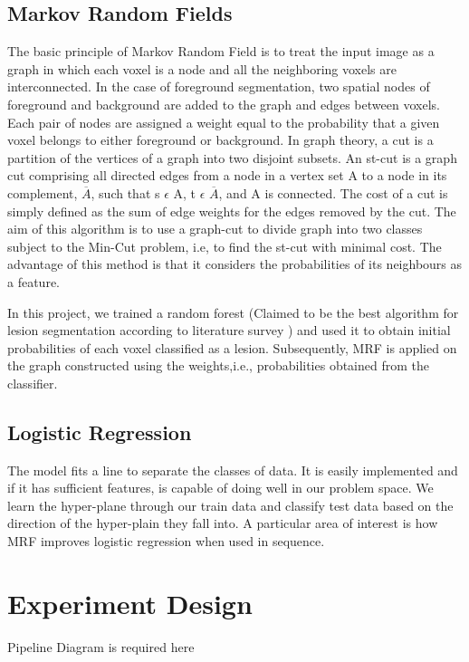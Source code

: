 \documentclass{article} %
\begin{document}
\subsection{Markov Random Fields}
The basic principle of Markov Random Field is to treat the input image as a graph in which each voxel is a node and all the neighboring voxels are interconnected. In the case of foreground segmentation, two spatial nodes of foreground and background are added to the graph and edges between voxels. Each pair of nodes are assigned a weight equal to the probability that a given voxel belongs to either foreground or background. In graph theory, a cut is a partition of the vertices of a graph into two disjoint subsets. An st-cut is a graph cut comprising all directed edges from a node in a vertex set A to a node in its complement, $\overline{A}$, such that s $\epsilon$ A, t $\epsilon$ $\overline{A}$, and A is connected. The cost of a cut is simply defined as the sum of edge weights for the edges removed by the cut. The aim of this algorithm is to use a graph-cut to divide graph into two classes subject to the Min-Cut problem, i.e, to find the st-cut with minimal cost. The advantage of this method is that it considers the probabilities of its neighbours as a feature.

In this project, we trained a random forest (Claimed to be the best algorithm for lesion segmentation according to literature survey \cite{garcia2013review}) and used it to obtain initial probabilities of each voxel classified as a lesion. Subsequently, MRF is applied on the graph constructed using the weights,i.e., probabilities obtained from the classifier.

\subsection{Logistic Regression} 
The model fits a line to separate the classes of data. It is easily implemented and if it has sufficient features, is capable of doing well in our problem space. We learn the hyper-plane through our train data and classify test data based on the direction of the hyper-plain they fall into. A particular area of interest is how MRF improves logistic regression when used in sequence.


\section{Experiment Design}
Pipeline Diagram is required here
\end{document}
